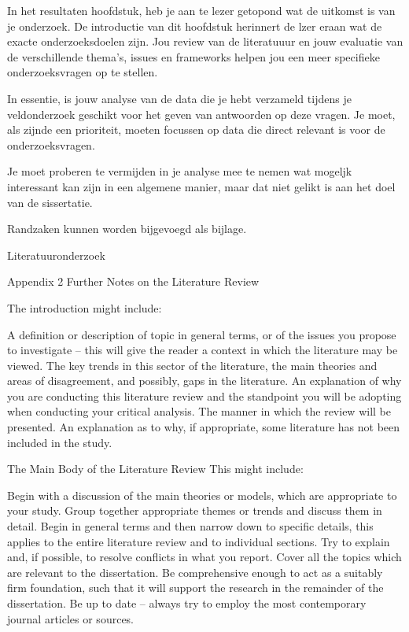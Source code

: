 			
			In het resultaten hoofdstuk, heb je aan te lezer getopond wat de uitkomst is van je onderzoek. De introductie van dit hoofdstuk herinnert de lzer eraan wat de exacte onderzoeksdoelen zijn. Jou review van de literatuuur en jouw evaluatie van de verschillende thema's, issues en frameworks helpen jou  een meer specifieke onderzoeksvragen op te stellen.
			
			In essentie, is jouw analyse van de data die je hebt verzameld tijdens je veldonderzoek geschikt voor het geven van antwoorden op deze vragen. Je moet, als zijnde een prioriteit,   moeten focussen op data die direct relevant is voor de onderzoeksvragen.
			
			Je moet proberen te vermijden in je analyse mee te nemen wat mogeljk interessant kan zijn in een algemene manier, maar dat niet gelikt is aan het doel van de sissertatie.
			
			Randzaken kunnen worden bijgevoegd als bijlage.
			
			Literatuuronderzoek
			
			
			Appendix 2  Further Notes on the Literature Review
			
			The introduction might include:
			
			A definition or description of topic in general terms, or of the issues you propose to investigate – this will give the reader a context in which the literature may be viewed.
			The key trends in this sector of the literature, the main theories and areas of disagreement, and possibly, gaps in the literature.
			An explanation of why you are conducting this literature review and the standpoint you will be adopting when conducting your critical analysis.
			The manner in which the review will be presented.
			An explanation as to why, if appropriate, some literature has not been included in the study.
			
			The Main Body of the Literature Review
			This might include:
			
			Begin  with  a  discussion  of  the  main  theories  or  models,  which  are appropriate to your study.
			Group together appropriate themes or trends and discuss them in detail.
			Begin  in  general  terms  and  then  narrow  down  to  specific  details,  this applies to the entire literature review and to individual sections.
			Try to explain and, if possible, to resolve conflicts in what you report.
			Cover all the topics which are relevant to the dissertation.
			Be comprehensive enough to act as a suitably firm foundation, such that it will support the research in the remainder of the dissertation.
			Be up  to  date  –  always  try  to employ the  most  contemporary  journal articles or sources.
			
